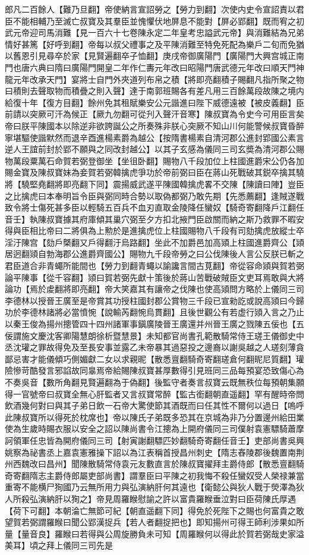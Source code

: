 郎凡二百餘人【難乃旦翻】帝使納言宣詔勞之【勞力到翻】次使内史令宣詔責以君臣不能相輔乃至滅亡叔寶及其羣臣並愧懼伏地屏息不能對【屏必郢翻】既而宥之初武元帝迎司馬消難【見一百六十七卷陳永定二年皇考忠謚武元帝】與消難結為兄弟情好甚篤【好呼到翻】帝每以叔父禮事之及平陳消難至特免死配為樂戶二旬而免猶以舊恩引見尋卒於家【見賢遍翻卒子恤翻】庚戌帝御廣陽門【廣陽門大興宫城正南門也唐六典曰隋曰廣陽門開皇二年作仁夀元年改曰昭陽門唐武德元年改曰順天門神龍元年改承天門】宴將士自門外夾道列布帛之積【將即亮翻積子賜翻凡指所聚之物曰積則去聲取物而積疊之則入聲】達于南郭班賜各有差凡用三百餘萬段故陳之境内給復十年【復方目翻】餘州免其租賦樂安公元諧進曰陛下威德遠被【被皮義翻】臣前請以突厥可汗為候正【厥九勿翻可從刋入聲汗音寒】陳叔寶為令史今可用臣言矣帝曰朕平陳國本以除逆非欲誇誕公之所奏殊非朕心突厥不知山川何能警候叔寶昏醉寧堪驅使諧默然而退辛酉進楊素爵為越公【按隋書楊素自清河郡公進封郢國公素言逆人王誼前封於郢不願與之同改封越公】以其子玄感為儀同三司玄奬為清河郡公賜物萬段粟萬石命賀若弼登御坐【坐徂卧翻】賜物八千段加位上柱國進爵宋公仍各加賜金寶及陳叔寶妹為妾賀若弼韓擒虎爭功於帝前弼曰臣在蔣山死戰破其鋭卒擒其驍將【驍堅堯翻將即亮翻下同】震揚威武遂平陳國韓擒虎畧不交陳【陳讀曰陣】豈臣之比擒虎曰本奉明旨令臣與弼同時合勢以取偽都弼乃敢先期【先悉薦翻】逢賊遂戰致令將士傷死甚多臣以輕騎五百兵不血刃直取金陵降任蠻奴【騎奇寄翻降戶江翻任音壬】執陳叔寶據其府庫傾其巢穴弼至夕方扣北掖門臣啟關而納之斯乃救罪不暇安得與臣相比帝曰二將俱為上勲於是進擒虎位上柱國賜物八千段有司劾擒虎放縱士卒淫汙陳宫【劾戶槩翻又戶得翻汙烏路翻】坐此不加爵邑加高熲上柱國進爵齊公【熲居迥翻熲自勃海郡公進爵齊國公】賜物九千段帝勞之曰公伐陳後人言公反朕已斬之君臣道合非青蠅所能間也【勞力到翻青蠅以諭讒言間古莧翻】帝從容命熲與賀若弼論平陳事【從千容翻】熲曰賀若弼先獻十策後於蔣山苦戰破賊臣文吏耳焉敢與大將論功【焉於䖍翻將即亮翻】帝大笑嘉其有讓帝之伐陳也使高熲問方略於上儀同三司李德林以授晉王廣至是帝賞其功授柱國封郡公賞物三千段已宣勑訖或說高熲曰今歸功於李德林諸將必當憤惋【說輸芮翻惋烏貫翻】且後世觀公有若虚行熲入言之乃止以秦王俊為揚州摠管四十四州諸軍事鎭廣陵晉王廣還并州晉王廣之戮陳五佞也【五佞謂施文慶沈客卿陽慧朗徐析暨慧景】未知都官尚書孔範散騎常侍王瑳王儀御史中丞沈瓘之罪故得免及至長安事並露乙未帝暴其過惡投之邊裔以謝吳越之人瑳刻薄貪鄙忌害才能儀傾巧側媚獻二女以求親昵【散悉亶翻騎奇寄翻瑳倉何翻昵尼質翻】瓘險慘苛酷發言邪諂故同辠焉帝給賜陳叔寶甚厚數得引見班同三品每預宴恐致傷心為不奏吳音【數所角翻見賢遍翻為于偽翻】後監守者奏言叔寶云既無秩位每預朝集願得一官號帝曰叔寶全無心肝監者又言叔寶常醉【監古銜翻朝直遥翻】罕有醒時帝問飲酒幾何對曰與其子弟日飲一石帝大驚使節其酒既而曰任其性不爾何以過日【嗚呼此陳叔寶所以得死於枕席也】帝以陳氏子弟既多恐其在京城為非乃分置邊州給田業使為生歲時賜衣服以安全之詔以陳尚書令江摠為上開府儀同三司僕射袁憲驃騎蕭摩訶領軍任忠皆為開府儀同三司【射寅謝翻驃匹妙翻騎奇寄翻任音壬】吏部尚書吳興姚察為祕書丞上嘉袁憲雅操下詔以為江表稱首授昌州刺史【隋志舂陵郡後魏置南荆州西魏改曰昌州】聞陳散騎常侍袁元友數直言於陳叔寶擢拜主爵侍郎【散悉亶翻騎奇寄翻隋志主爵侍郎屬吏部尚書】謂羣臣曰平陳之初我悔不殺任蠻奴受人榮禄兼當重寄不能横尸狥國乃云無所用力與弘演納肝何其遠也【衛懿公與狄人戰于熒澤為狄人所殺弘演納肝以狥之】帝見周羅睺慰諭之許以富貴羅睺垂泣對曰臣荷陳氏厚遇【荷下可翻】本朝淪亡無節可紀【朝直遥翻下同】得免於死陛下之賜也何富貴之敢望賀若弼謂羅睺曰聞公郢漢捉兵【若人者翻捉把也】即知揚州可得王師利涉果如所量【量音良】羅睺曰若得與公周旋勝負未可知【周羅睺何以得此於賀若弼哉史家溢美耳】頃之拜上儀同三司先是